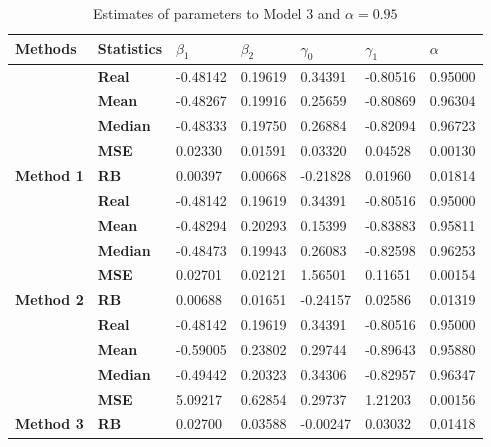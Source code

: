 \begin{table}

\caption{\label{tab:Est_model_3_Alpha0.95}Estimates of parameters to Model 3 and $\alpha=0.95$}
\centering
\begin{tabular}[t]{>{}l>{}llllll}
\toprule
Methods & Statistics & $\beta_1$ & $\beta_2$ & $\gamma_0$ & $\gamma_1$ & $\alpha$\\
\midrule
 & \textbf{Real} & -0.48142 & 0.19619 & 0.34391 & -0.80516 & 0.95000\\
\cmidrule{2-7}
 & \textbf{Mean} & -0.48267 & 0.19916 & 0.25659 & -0.80869 & 0.96304\\
\cmidrule{2-7}
 & \textbf{Median} & -0.48333 & 0.19750 & 0.26884 & -0.82094 & 0.96723\\
\cmidrule{2-7}
 & \textbf{MSE} & 0.02330 & 0.01591 & 0.03320 & 0.04528 & 0.00130\\
\cmidrule{2-7}
\multirow{-5}{*}{\raggedright\arraybackslash \textbf{Method 1}} & \textbf{RB} & 0.00397 & 0.00668 & -0.21828 & 0.01960 & 0.01814\\
\cmidrule{1-7}
 & \textbf{Real} & -0.48142 & 0.19619 & 0.34391 & -0.80516 & 0.95000\\
\cmidrule{2-7}
 & \textbf{Mean} & -0.48294 & 0.20293 & 0.15399 & -0.83883 & 0.95811\\
\cmidrule{2-7}
 & \textbf{Median} & -0.48473 & 0.19943 & 0.26083 & -0.82598 & 0.96253\\
\cmidrule{2-7}
 & \textbf{MSE} & 0.02701 & 0.02121 & 1.56501 & 0.11651 & 0.00154\\
\cmidrule{2-7}
\multirow{-5}{*}{\raggedright\arraybackslash \textbf{Method 2}} & \textbf{RB} & 0.00688 & 0.01651 & -0.24157 & 0.02586 & 0.01319\\
\cmidrule{1-7}
 & \textbf{Real} & -0.48142 & 0.19619 & 0.34391 & -0.80516 & 0.95000\\
\cmidrule{2-7}
 & \textbf{Mean} & -0.59005 & 0.23802 & 0.29744 & -0.89643 & 0.95880\\
\cmidrule{2-7}
 & \textbf{Median} & -0.49442 & 0.20323 & 0.34306 & -0.82957 & 0.96347\\
\cmidrule{2-7}
 & \textbf{MSE} & 5.09217 & 0.62854 & 0.29737 & 1.21203 & 0.00156\\
\cmidrule{2-7}
\multirow{-5}{*}{\raggedright\arraybackslash \textbf{Method 3}} & \textbf{RB} & 0.02700 & 0.03588 & -0.00247 & 0.03032 & 0.01418\\
\bottomrule
\end{tabular}
\end{table}
